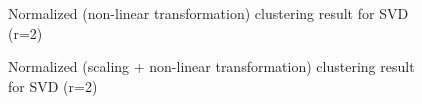 \documentclass[runningheads]{llncs}
\begin{document}
\begin{figure}
\centering
{}
\caption{Normalized (non-linear transformation) clustering result for SVD (r=2)} \label{Q8_SVD_nonlinear}
\end{figure}

\begin{figure}
\centering
{}
\caption{Normalized (scaling + non-linear transformation) clustering result for SVD (r=2)} \label{Q8_SVD_scale_nonlinear}
\end{figure}
\end{document}
